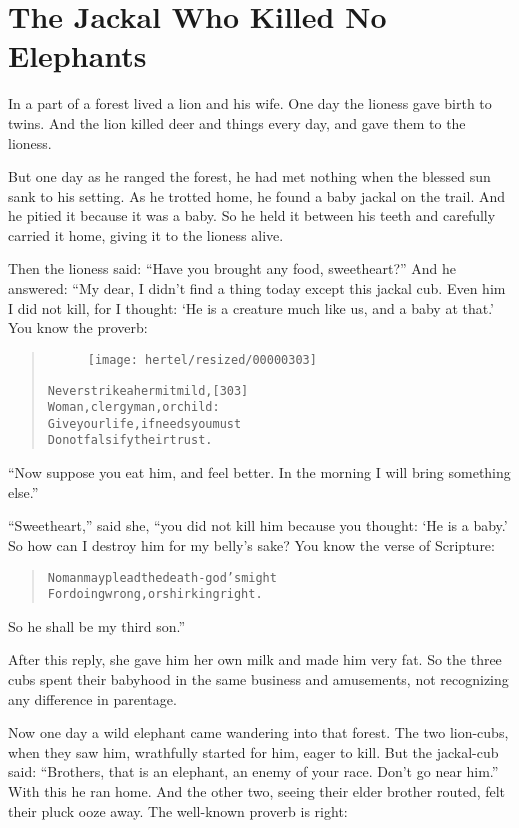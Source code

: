 \documentclass[article, twoside, 10pt]{memoir}
\renewenvironment{verbatim}{%
\begin{quote}%
\vskip -10pt%
\begin{alltt}\normalfont\small}{\end{alltt}%
\end{quote}%
\vskip -10pt
} %
\begin{document}
\chapter{The Jackal Who Killed No Elephants}

In a part of a forest lived a lion and his wife. One day the
lioness gave birth to twins. And the lion killed deer and things
every day, and gave them to the lioness.

But one day as he ranged the forest, he had met nothing when the
blessed sun sank to his setting. As he trotted home, he found a
baby jackal on the trail. And he pitied it because it was a baby.
So he held it between his teeth and carefully carried it home,
giving it to the lioness alive.

Then the lioness said: ``Have you brought any food, sweetheart?''
And he answered: “My dear, I didn't find a thing today except this
jackal cub. Even him I did not kill, for I thought:
`He is a creature much like us, and a baby at that.' You know the
proverb:

\begin{verbatim}
\begin{figure}[p]\texttt{[image: hertel/resized/00000303]}\end{figure}Never strike a hermit mild,                             [303]
Woman, clergyman, or child:
Give your life, if needs you must{\textemdash}
Do not falsify their trust.
\end{verbatim}
``Now suppose you eat him, and feel better. In the morning I will bring something else.''

``Sweetheart,'' said she, “you did not kill him because you
thought: `He is a baby.' So how can I destroy him for my belly's
sake? You know the verse of Scripture:

\begin{verbatim}
No man may plead the death-god's might
For doing wrong, or shirking right.
\end{verbatim}
So he shall be my third son.”

After this reply, she gave him her own milk and made him very fat.
So the three cubs spent their babyhood in the same business and
amusements, not recognizing any difference in parentage.

Now one day a wild elephant came wandering into that forest. The
two lion-cubs, when they saw him, wrathfully started for him, eager
to kill. But the jackal-cub said:
``Brothers, that is an elephant, an enemy of your race. Don't go near him.''
With this he ran home. And the other two, seeing their elder
brother routed, felt their pluck ooze away. The well-known proverb
is right:
\end{document}
